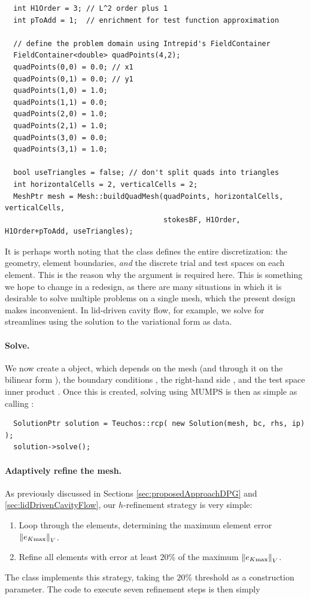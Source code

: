 \begin{lstlisting}
  int H1Order = 3; // L^2 order plus 1
  int pToAdd = 1;  // enrichment for test function approximation
  
  // define the problem domain using Intrepid's FieldContainer
  FieldContainer<double> quadPoints(4,2);
  quadPoints(0,0) = 0.0; // x1
  quadPoints(0,1) = 0.0; // y1
  quadPoints(1,0) = 1.0;
  quadPoints(1,1) = 0.0;
  quadPoints(2,0) = 1.0;
  quadPoints(2,1) = 1.0;
  quadPoints(3,0) = 0.0;
  quadPoints(3,1) = 1.0;
  
  bool useTriangles = false; // don't split quads into triangles
  int horizontalCells = 2, verticalCells = 2;
  MeshPtr mesh = Mesh::buildQuadMesh(quadPoints, horizontalCells, verticalCells,
                                     stokesBF, H1Order, H1Order+pToAdd, useTriangles);
\end{lstlisting}
It is perhaps worth noting that the  class defines the entire discretization: the geometry, element boundaries, \emph{and} the discrete trial and test spaces on each element.  This is the reason why the  argument is required here.  This is something we hope to change in a redesign, as there are many situations in which it is desirable to solve multiple problems on a single mesh, which the present design makes inconvenient.  In lid-driven cavity flow, for example, we solve for streamlines using the solution to the  variational form as data.

\paragraph{Solve.}
We now create a  object, which depends on the mesh  (and through it on the bilinear form ), the boundary conditions , the right-hand side , and the test space inner product .  Once this is created, solving using MUMPS is then as simple as calling :

\begin{lstlisting}
  SolutionPtr solution = Teuchos::rcp( new Solution(mesh, bc, rhs, ip) );
  solution->solve();
\end{lstlisting}

\paragraph{Adaptively refine the mesh.}
As previously discussed in Sections \ref{sec:proposedApproachDPG} and \ref{sec:lidDrivenCavityFlow}, our $h$-refinement strategy is very simple:
\begin{enumerate}
\item Loop through the elements, determining the maximum element error $\norm{e_{K{\rm max}}}_{V}$.
\item Refine all elements with error at least 20\% of the maximum $\norm{e_{K{\rm max}}}_{V}$.
\end{enumerate}
The  class implements this strategy, taking the $20\%$ threshold as a construction parameter.  The code to execute seven refinement steps is then simply


